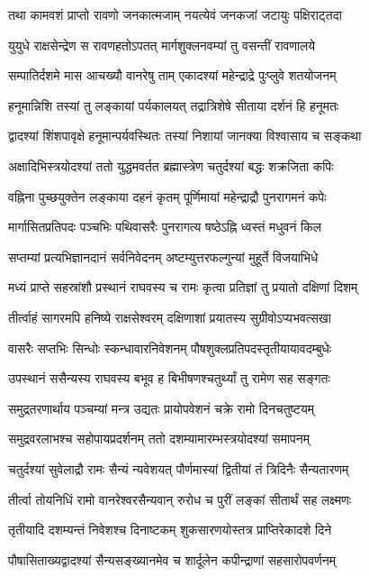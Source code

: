 \twolineshloka
{तथा कामवशं प्राप्तो रावणो जनकात्मजाम्}
{नयत्येवं जनकजां जटायुः पक्षिराट्तदा}%

\twolineshloka
{युयुधे राक्षसेन्द्रेण स रावणहतोऽपतत्}
{मार्गशुक्लनवम्यां तु वसन्तीं रावणालये}%

\twolineshloka
{सम्पातिर्दशमे मास आचख्यौ वानरेषु ताम्}
{एकादश्यां महेन्द्राद्रे पुःप्लुवे शतयोजनम्}%

\twolineshloka
{हनूमान्निशि तस्यां तु लङ्कायां पर्यकालयत्}
{तद्रात्रिशेषे सीताया दर्शनं हि हनूमतः}%

\twolineshloka
{द्वादश्यां शिंशपावृक्षे हनूमान्पर्यवस्थितः}
{तस्यां निशायां जानक्या विश्वासाय च सङ्कथा}%

\twolineshloka
{अक्षादिभिस्त्रयोदश्यां ततो युद्धमवर्तत}
{ब्रह्मास्त्रेण चतुर्दश्यां बद्धः शक्रजिता कपिः}%

\twolineshloka
{वह्निना पुच्छयुक्तेन लङ्काया दहनं कृतम्}
{पूर्णिमायां महेन्द्राद्रौ पुनरागमनं कपेः}%

\twolineshloka
{मार्गासितप्रतिपदः पञ्चभिः पथिवासरैः}
{पुनरागत्य षष्ठेऽह्नि ध्वस्तं मधुवनं किल}%

\twolineshloka
{सप्तम्यां प्रत्यभिज्ञानदानं सर्वनिवेदनम्}
{अष्टम्युत्तरफल्गुन्यां मुहूर्ते विजयाभिधे}%

\twolineshloka
{मध्यं प्राप्ते सहस्रांशौ प्रस्थानं राघवस्य च}
{रामः कृत्वा प्रतिज्ञां तु प्रयातो दक्षिणां दिशम्}%

\twolineshloka
{तीर्त्वाहं सागरमपि हनिष्ये राक्षसेश्वरम्}
{दक्षिणाशां प्रयातस्य सुग्रीवोऽप्यभवत्सखा}%

\twolineshloka
{वासरैः सप्तभिः सिन्धोः स्कन्धावारनिवेशनम्}
{पौषशुक्लप्रतिपदस्तृतीयायावदम्बुधेः}%

\twolineshloka
{उपस्थानं ससैन्यस्य राघवस्य बभूव ह}
{बिभीषणश्चतुर्थ्यां तु रामेण सह सङ्गतः}%

\twolineshloka
{समुद्रतरणार्थाय पञ्चम्यां मन्त्र उद्यतः}
{प्रायोपवेशनं चक्रे रामो दिनचतुष्टयम्}%

\twolineshloka
{समुद्रवरलाभश्च सहोपायप्रदर्शनम्}
{ततो दशम्यामारम्भस्त्रयोदश्यां समापनम्}%

\twolineshloka
{चतुर्दश्यां सुवेलाद्रौ रामः सैन्यं न्यवेशयत्}
{पौर्णमास्यां द्वितीयां तं त्रिदिनैः सैन्यतारणम्}%

\twolineshloka
{तीर्त्वा तोयनिधिं रामो वानरेश्वरसैन्यवान्}
{रुरोध च पुरीं लङ्कां सीतार्थं सह लक्ष्मणः}%

\twolineshloka
{तृतीयादि दशम्यन्तं निवेशश्च दिनाष्टकम्}
{शुकसारणयोस्तत्र प्राप्तिरेकादशे दिने}%

\twolineshloka
{पौषासिताख्यद्वादश्यां सैन्यसङ्ख्यानमेव च}
{शार्दूलेन कपीन्द्राणां सहसारोपवर्णनम्}%

